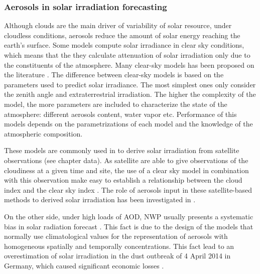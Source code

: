 \subsubsection{Aerosols in solar irradiation forecasting}

Although clouds are the main driver of variability of solar resource, under cloudless conditions, aerosols reduce the amount of solar energy reaching the earth's surface. Some models compute solar irradiance in clear sky conditions, which means that the they calculate attenuation of solar irradiation only due to the constituents of the atmosphere. Many clear-sky models has been proposed on the literature \cite*{Gueymard2012}. The difference between clear-sky models is based on the parameters used to predict solar irradiance. The most simplest ones only consider the zenith angle and extraterrestrial irradiation. The higher the complexity of the model, the more parameters are included to characterize the state of the atmosphere: different aerosols content, water vapor etc. Performance of this models depends on the parametrizations of each model and the knowledge of the atmospheric composition.
 
These models are commonly used in to derive solar irradiation from satellite observations (see chapter data). As satellite are able to give observations of the cloudiness at a given time and site, the use of a clear sky model in combination with this observation make easy to establish a relationship between the cloud index and the clear sky index . The role of aerosols input in these satellite-based methods to derived solar irradiation has been investigated in \cite*{Polo2014}. 

On the other side, under high loads of AOD, NWP usually presents a systematic bias in solar radiation forecast \cite*{Rieger2017}. This fact is due to the design of the models that normally use climatological values for the representation of aerosols with homogeneous spatially and temporally concentrations. This fact lead to an overestimation of solar irradiation in the dust outbreak of 4 April 2014 in Germany, which caused significant economic losses \cite{Rieger2017}.


